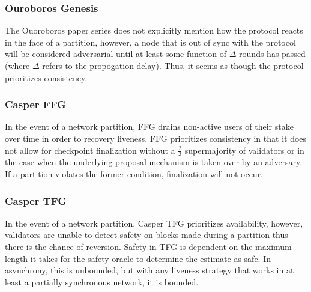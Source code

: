 \documentclass[10pt,journal,compsoc]{IEEEtran}
\begin{document}
\subsubsection{Ouroboros Genesis} The Ouoroboros paper series does not explicitly mention how the protocol reacts in the face of a partition, however, a node that is out of sync with the protocol will be considered adversarial until at least some function of $\Delta$ rounds has passed (where $\Delta$ refers to the propogation delay). Thus, it seems as though the protocol prioritizes consistency. 

\subsubsection{Casper FFG} In the event of a network partition, FFG drains non-active users of their stake over time in order to recovery liveness. FFG prioritizes consistency in that it does not allow for checkpoint finalization without a \(\frac{2}{3}\) supermajority of validators or in the case when the underlying proposal mechanism is taken over by an adversary. If a partition violates the former condition, finalization will not occur. 

\subsubsection{Casper TFG} In the event of a network partition, Casper TFG prioritizes availability, however, validators are unable to detect safety on blocks made during a partition thus there is the chance of reversion. Safety in TFG is dependent on the maximum length it takes for the safety oracle to determine the estimate as safe. In asynchrony, this is unbounded, but with any liveness strategy that works in at least a partially synchronous network, it is bounded.      
%
%
\end{document}
